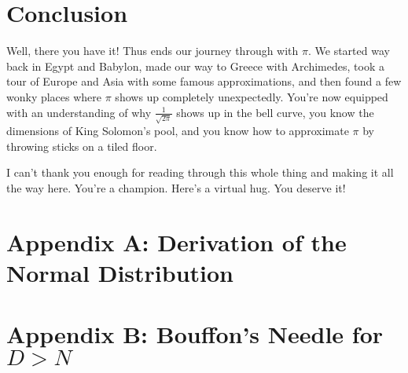 \documentclass[11pt,titlepage]{article}
\begin{document}
\section*{Conclusion}

Well, there you have it! Thus ends our journey through with $\pi$. We started way back in Egypt and Babylon, made our way to Greece with Archimedes, took a tour of Europe and Asia with some famous approximations, and then found a few wonky places where $\pi$ shows up completely unexpectedly. You're now equipped with an understanding of why $\frac{1}{\sqrt{2\pi}}$ shows up in the bell curve, you know the dimensions of King Solomon's pool, and you know how to approximate $\pi$ by throwing sticks on a tiled floor. 

I can't thank you enough for reading through this whole thing and making it all the way here. You're a champion. Here's a virtual hug. You deserve it!





\newpage
\section*{Appendix A: Derivation of the Normal Distribution}

\newpage
\section*{Appendix B: Bouffon's Needle for $D>N$}\label{AppendixB}
\end{document}
